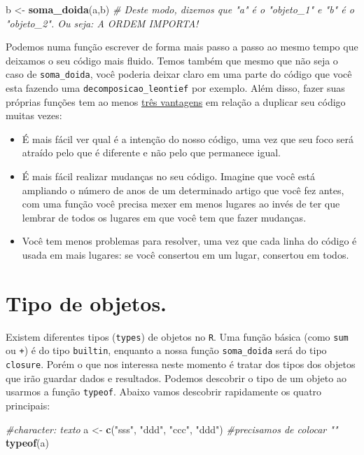 \documentclass[
]{article}
\newenvironment{Shaded}{\begin{snugshade}}{\end{snugshade}}
\newcommand{\CommentTok}[1]{\textcolor[rgb]{0.56,0.35,0.01}{\textit{#1}}}
\newcommand{\KeywordTok}[1]{\textcolor[rgb]{0.13,0.29,0.53}{\textbf{#1}}}
\newcommand{\NormalTok}[1]{#1}
\newcommand{\StringTok}[1]{\textcolor[rgb]{0.31,0.60,0.02}{#1}}
\begin{document}
\begin{Shaded}
\begin{Highlighting}[]
\NormalTok{b <-}\StringTok{ }\KeywordTok{soma_doida}\NormalTok{(a,b) }\CommentTok{# Deste modo, dizemos que "a" é o "objeto_1" e "b" é o "objeto_2". Ou seja: A ORDEM IMPORTA!}
\end{Highlighting}
\end{Shaded}

Podemos numa função escrever de forma mais passo a passo ao mesmo tempo
que deixamos o seu código mais fluido. Temos também que mesmo que não
seja o caso de \texttt{soma\_doida}, você poderia deixar claro em uma
parte do código que você esta fazendo uma
\texttt{decomposicao\_leontief} por exemplo. Além disso, fazer suas
próprias funções tem ao menos
\href{https://r4ds.had.co.nz/iteration.html\#introduction-14}{três
vantagens} em relação a duplicar seu código muitas vezes:

\begin{itemize}
\item
  É mais fácil ver qual é a intenção do nosso código, uma vez que seu
  foco será atraído pelo que é diferente e não pelo que permanece igual.
\item
  É mais fácil realizar mudanças no seu código. Imagine que você está
  ampliando o número de anos de um determinado artigo que você fez
  antes, com uma função você precisa mexer em menos lugares ao invés de
  ter que lembrar de todos os lugares em que você tem que fazer
  mudanças.
\item
  Você tem menos problemas para resolver, uma vez que cada linha do
  código é usada em mais lugares: se você consertou em um lugar,
  consertou em todos.
\end{itemize}

\hypertarget{tipo-de-objetos.}{%
\section{Tipo de objetos.}\label{tipo-de-objetos.}}

Existem diferentes tipos (\texttt{types}) de objetos no \texttt{R}. Uma
função básica (como \texttt{sum} ou \texttt{+}) é do tipo
\texttt{builtin}, enquanto a nossa função \texttt{soma\_doida} será do
tipo \texttt{closure}. Porém o que nos interessa neste momento é tratar
dos tipos dos objetos que irão guardar dados e resultados. Podemos
descobrir o tipo de um objeto ao usarmos a função \texttt{typeof}.
Abaixo vamos descobrir rapidamente os quatro principais:

\begin{Shaded}
\begin{Highlighting}[]
\CommentTok{#character: texto}
\NormalTok{a <-}\StringTok{ }\KeywordTok{c}\NormalTok{(}\StringTok{"sss"}\NormalTok{, }\StringTok{"ddd"}\NormalTok{, }\StringTok{"ccc"}\NormalTok{, }\StringTok{"ddd"}\NormalTok{) }\CommentTok{#precisamos de colocar ""}
\KeywordTok{typeof}\NormalTok{(a)}
\end{Highlighting}
\end{Shaded}
\end{document}
